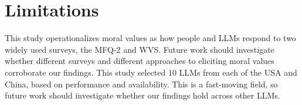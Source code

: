 \documentclass[11pt,a4paper]{article}
\begin{document}
\section{Limitations}

This study operationalizes moral values as how people and LLMs respond to two widely used surveys, the MFQ-2 and WVS. Future work should investigate whether different surveys and different approaches to eliciting moral values corroborate our findings. This study selected 10 LLMs from each of the USA and China, based on performance and availability. This is a fast-moving field, so future work should investigate whether our findings hold across other LLMs.



%
\end{document}

